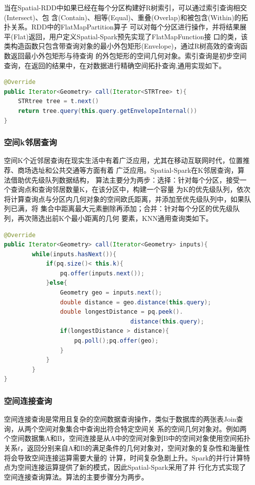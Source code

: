 当在Spatial-RDD中如果已经在每个分区构建好R树索引，可以通过索引查询相交(Intersect)、包
含(Contain)、相等(Equal)、重叠(Overlap)和被包含(Within)的拓扑关系。RDD中的FlatMapPartition算子
可以对每个分区进行操作，并将结果展平(Flat)返回，用户定义Spatial-Spark预先实现了FlatMapFunction接
口的类，该类构造函数只包含带查询对象的最小外包矩形(Envelope)，通过R树高效的查询函数返回最小外包矩形与待查询
的外包矩形的空间几何对象。索引查询是初步空间查询，在返回的结果中，在对数据进行精确空间拓扑查询,通用实现如下。
\begin{lstlisting}[language=Java]
@Override
public Iterator<Geometry> call(Iterator<STRTree> t){
    STRtree tree = t.next()
    return tree.query(this.query.getEnvelopeInternal())
}
\end{lstlisting}

\subsubsection{空间k邻居查询}
空间K个近邻居查询在现实生活中有着广泛应用，尤其在移动互联网时代，位置推荐、商场选址和公共交通等方面有着
广泛应用\cite{董亭亭2013大数据下空间数据索引和}。Spatial-Spark在K邻居查询，算法借助优先级队列数据结构，
算法主要分为两步：选择：针对每个分区，接受一个查询点和查询邻居数量K，在该分区中，构建一个容量
为K的优先级队列，依次将计算查询点与分区内几何对象的空间欧氏距离，并添加至优先级队列中，如果队列已满，将
集合中距离最大元素删除再添加；合并：针对每个分区的优先级队列，再次筛选出前K个最小距离的几何
要素，KNN通用查询类如下。
\begin{lstlisting}[language=Java]
@Override
public Iterator<Geometry> call(Iterator<Geometry> inputs){
        while(inputs.hasNext()){
            if(pq.size()< this.k){
                pq.offer(inputs.next());
            }else{
                Geometry geo = inputs.next();
                double distance = geo.distance(this.query);
                double longestDistance = pq.peek().
                                    distance(this.query);
                if(longestDistance > distance){
                    pq.poll();pq.offer(geo);
                }
            }
        }
}
\end{lstlisting}


\subsubsection{空间连接查询}
空间连接查询是常用且复杂的空间数据查询操作，类似于数据库的两张表Join查询，从两个空间对象集合中查询出符合特定空间关
系的空间几何对象对\cite{Jacox2007Spatial}。例如两个空间数据集A和B，空间连接是从A中的空间对象到B中的空间对象使用空间拓扑
关系$t$，返回分别来自A和B的满足条件的几何对象对，空间对象的复杂性和海量性将会导致空间连接运算需要大量的
计算，时间复杂急剧上升。Spark的并行计算特点为空间连接运算提供了新的模式，因此Spatial-Spark采用了并
行化方式实现了空间连接查询算法。算法的主要步骤分为两步。

